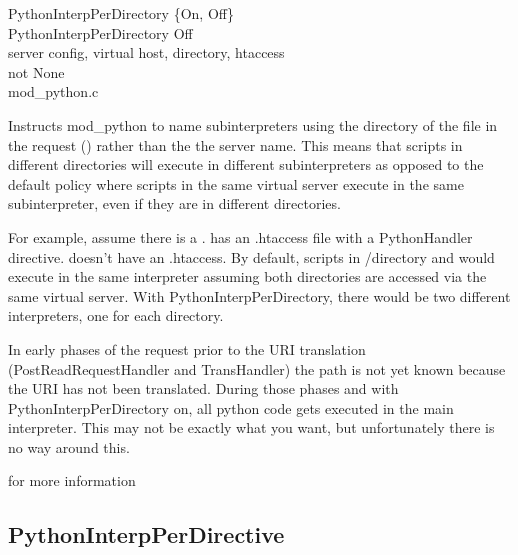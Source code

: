 PythonInterpPerDirectory \{On, Off\} \\
PythonInterpPerDirectory Off\\
server config, virtual host, directory, htaccess\\
not None\\
mod_python.c

Instructs mod_python to name subinterpreters using the directory of
the file in the request () rather than the the
server name. This means that scripts in different directories will
execute in different subinterpreters as opposed to the default policy
where scripts in the same virtual server execute in the same
subinterpreter, even if they are in different directories.

For example, assume there is a
.  has an .htaccess
file with a PythonHandler directive.  
doesn't have an .htaccess. By default, scripts in /directory and
 would execute in the same interpreter assuming
both directories are accessed via the same virtual server. With
PythonInterpPerDirectory, there would be two different interpreters,
one for each directory.

\begin{notice}
  In early phases of the request prior to the URI translation
  (PostReadRequestHandler and TransHandler) the path is not yet known
  because the URI has not been translated. During those phases and
  with PythonInterpPerDirectory on, all python code gets executed in
  the main interpreter. This may not be exactly what you want, but
  unfortunately there is no way around this.
\end{notice}

\begin{seealso}
           {for more information}
\end{seealso}

\subsection{PythonInterpPerDirective\label{dir-other-ipdv}}

